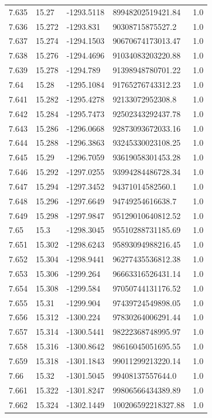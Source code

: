 \begin{tabular}{lllll}
7.635 & 15.27 & -1293.5118 & 89948202519421.84 & 1.0 \\
7.636 & 15.272 & -1293.831 & 90308715875527.2 & 1.0 \\
7.637 & 15.274 & -1294.1503 & 90670674173013.47 & 1.0 \\
7.638 & 15.276 & -1294.4696 & 91034083203220.88 & 1.0 \\
7.639 & 15.278 & -1294.789 & 91398948780701.22 & 1.0 \\
7.64 & 15.28 & -1295.1084 & 91765276743312.23 & 1.0 \\
7.641 & 15.282 & -1295.4278 & 92133072952308.8 & 1.0 \\
7.642 & 15.284 & -1295.7473 & 92502343292437.78 & 1.0 \\
7.643 & 15.286 & -1296.0668 & 92873093672033.16 & 1.0 \\
7.644 & 15.288 & -1296.3863 & 93245330023108.25 & 1.0 \\
7.645 & 15.29 & -1296.7059 & 93619058301453.28 & 1.0 \\
7.646 & 15.292 & -1297.0255 & 93994284486728.34 & 1.0 \\
7.647 & 15.294 & -1297.3452 & 94371014582560.1 & 1.0 \\
7.648 & 15.296 & -1297.6649 & 94749254616638.7 & 1.0 \\
7.649 & 15.298 & -1297.9847 & 95129010640812.52 & 1.0 \\
7.65 & 15.3 & -1298.3045 & 95510288731185.69 & 1.0 \\
7.651 & 15.302 & -1298.6243 & 95893094988216.45 & 1.0 \\
7.652 & 15.304 & -1298.9441 & 96277435536812.38 & 1.0 \\
7.653 & 15.306 & -1299.264 & 96663316526431.14 & 1.0 \\
7.654 & 15.308 & -1299.584 & 97050744131176.52 & 1.0 \\
7.655 & 15.31 & -1299.904 & 97439724549898.05 & 1.0 \\
7.656 & 15.312 & -1300.224 & 97830264006291.44 & 1.0 \\
7.657 & 15.314 & -1300.5441 & 98222368748995.97 & 1.0 \\
7.658 & 15.316 & -1300.8642 & 98616045051695.55 & 1.0 \\
7.659 & 15.318 & -1301.1843 & 99011299213220.14 & 1.0 \\
7.66 & 15.32 & -1301.5045 & 99408137557644.0 & 1.0 \\
7.661 & 15.322 & -1301.8247 & 99806566434389.89 & 1.0 \\
7.662 & 15.324 & -1302.1449 & 100206592218327.88 & 1.0 \\

\end{tabular}
